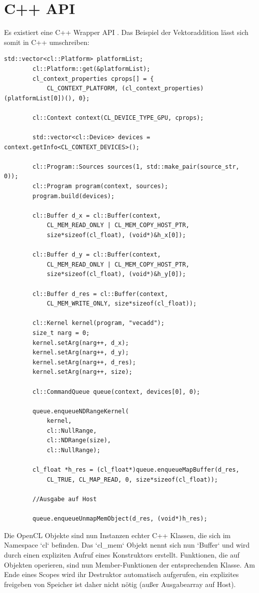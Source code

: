 		\section{C++ API}
		Es existiert eine C++ Wrapper \Gls{API} \autocite{oclC++API}.  Das Beispiel der Vektoraddition lässt sich somit in C++ umschreiben:
		\begin{lstlisting}[caption=OpenCL C++ API]
		std::vector<cl::Platform> platformList;
		cl::Platform::get(&platformList);
		cl_context_properties cprops[] = {
			CL_CONTEXT_PLATFORM, (cl_context_properties)(platformList[0])(), 0};
    
		cl::Context context(CL_DEVICE_TYPE_GPU, cprops);

		std::vector<cl::Device> devices = context.getInfo<CL_CONTEXT_DEVICES>();

		cl::Program::Sources sources(1, std::make_pair(source_str, 0));
		cl::Program program(context, sources);
		program.build(devices);

		cl::Buffer d_x = cl::Buffer(context, 
			CL_MEM_READ_ONLY | CL_MEM_COPY_HOST_PTR, 
			size*sizeof(cl_float), (void*)&h_x[0]);

		cl::Buffer d_y = cl::Buffer(context, 
			CL_MEM_READ_ONLY | CL_MEM_COPY_HOST_PTR, 
			size*sizeof(cl_float), (void*)&h_y[0]);

		cl::Buffer d_res = cl::Buffer(context, 
			CL_MEM_WRITE_ONLY, size*sizeof(cl_float));

		cl::Kernel kernel(program, "vecadd");
		size_t narg = 0;
		kernel.setArg(narg++, d_x);
		kernel.setArg(narg++, d_y);
		kernel.setArg(narg++, d_res);
		kernel.setArg(narg++, size);
    
		cl::CommandQueue queue(context, devices[0], 0);

		queue.enqueueNDRangeKernel(
			kernel, 
			cl::NullRange, 
			cl::NDRange(size), 
			cl::NullRange);
 
		cl_float *h_res = (cl_float*)queue.enqueueMapBuffer(d_res,
			CL_TRUE, CL_MAP_READ, 0, size*sizeof(cl_float));

		//Ausgabe auf Host
		
		queue.enqueueUnmapMemObject(d_res, (void*)h_res);
		\end{lstlisting}
		Die OpenCL Objekte sind nun Instanzen echter C++ Klassen, die sich im Namespace \li`cl` befinden. Das \li`cl_mem` Objekt nennt sich nun \li`Buffer` und wird durch einen expliziten Aufruf eines Konstruktors erstellt. Funktionen, die auf Objekten operieren, sind nun Member-Funktionen der entsprechenden Klasse. Am Ende eines Scopes wird ihr Destruktor automatisch aufgerufen, ein explizites freigeben von Speicher ist daher nicht nötig (außer Ausgabearray auf Host).
		
